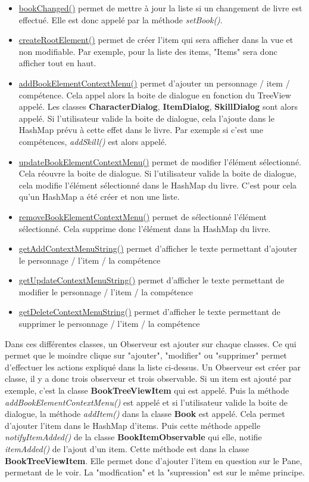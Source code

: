 			\begin{itemize}
				\item \underline{bookChanged()} permet de mettre à jour la liste si un changement de livre est effectué. Elle est donc appelé par la méthode \textit{setBook()}.
				\item \underline{createRootElement()} permet de créer l'item qui sera afficher dans la vue et non modifiable. Par exemple, pour la liste des items, "Items" sera donc afficher tout en haut.
				\item \underline{addBookElementContextMenu()} permet d'ajouter un personnage / item / compétence. Cela appel alors la boite de dialogue en fonction du TreeView appelé. Les classes \textbf{CharacterDialog}, \textbf{ItemDialog}, \textbf{SkillDialog} sont alors appelé. Si l'utilisateur valide la boite de dialogue, cela l'ajoute dans le HashMap prévu à cette effet dans le livre. Par exemple si c'est une compétences, \textit{addSkill()} est alors appelé.
				\item \underline{updateBookElementContextMenu()} permet de modifier l'élément sélectionné. Cela réouvre la boite de dialogue. Si l'utilisateur valide la boite de dialogue, cela modifie l'élément sélectionné dans le HashMap du livre. C'est pour cela qu'un HashMap a été créer et non une liste.
				\item \underline{removeBookElementContextMenu()} permet de sélectionné l'élément sélectionné. Cela supprime donc l'élément dans la HashMap du livre.
				\item \underline{getAddContextMenuString()} permet d'afficher le texte permettant d'ajouter le personnage / l'item / la compétence
				\item \underline{getUpdateContextMenuString()} permet d'afficher le texte permettant de modifier le personnage / l'item / la compétence
				\item \underline{getDeleteContextMenuString()} permet d'afficher le texte permettant de supprimer le personnage / l'item / la compétence
			\end{itemize}

			Dans ces différentes classes, un Observeur est ajouter sur chaque classes. Ce qui permet que le moindre clique sur "ajouter", "modifier" ou "supprimer" permet d'effectuer les actions expliqué dans la liste ci-dessus. Un Observeur est créer par classe, il y a donc trois observeur et trois observable. Si un item est ajouté par exemple, c'est la classe \textbf{BookTreeViewItem} qui est appelé. Puis la méthode \textit{addBookElementContextMenu()} est appelé et si l'utilisateur valide la boite de dialogue, la méthode \textit{addItem()} dans la classe \textbf{Book} est appelé. Cela permet d'ajouter l'item dans le HashMap d'items. Puis cette méthode appelle \textit{notifyItemAdded()} de la classe \textbf{BookItemObservable} qui elle, notifie \textit{itemAdded()} de l'ajout d'un item. Cette méthode est dans la classe \textbf{BookTreeViewItem}. Elle permet donc d'ajouter l'item en question sur le Pane, permetant de le voir. La "modfication" et la "supression" est sur le même principe.

